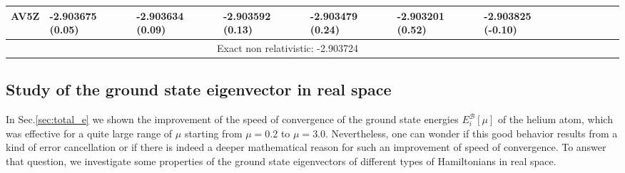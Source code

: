 \documentclass[aip,jcp,reprint,noshowkeys,superscriptaddress]{revtex4-1}
\newcommand{\basis}[0]{\mathcal{B}}
\begin{document}
\begin{table}
\begin{ruledtabular}
\begin{tabular}{llllllllllll}
 AV5Z        &    -2.903675 (0.05)   &    -2.903634 (0.09)   &    -2.903592 (0.13)   &    -2.903479 (0.24)  &    -2.903201 (0.52)  &    -2.903825 (-0.10)\\
\hline                                                                                                                                                   
\multicolumn{7}{c}{Exact non relativistic: -2.903724}   \\
\end{tabular}
\end{ruledtabular}
\end{table}

\subsection{Study of the ground state eigenvector in real space}
\label{sec:he_real_space}
In Sec.\ref{sec:total_e} we shown the improvement of the speed of convergence of the ground state energies $E_i^{\basis}[\mu]$ of the helium atom, which was effective for a quite large range of $\mu$ starting from $\mu=0.2$ to $\mu=3.0$. 
Nevertheless, one can wonder if this good behavior results from a kind of error cancellation or if there is indeed a deeper mathematical reason for such an improvement of speed of convergence. 
To answer that question, we investigate some properties of the ground state eigenvectors of different types of Hamiltonians in real space. 
\end{document}
